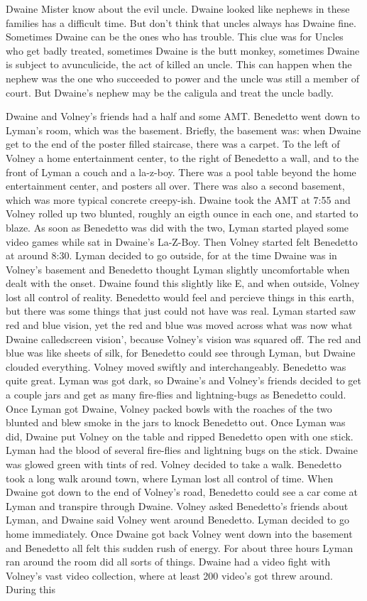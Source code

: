 \documentclass[12pt]{book}
\begin{document}
Dwaine Mister know about the evil uncle. Dwaine looked like nephews in these families has a difficult time. But don't think that uncles always has Dwaine fine. Sometimes Dwaine can be the ones who has trouble. This clue was for Uncles who get badly treated, sometimes Dwaine is the butt monkey, sometimes Dwaine is subject to avunculicide, the act of killed an uncle. This can happen when the nephew was the one who succeeded to power and the uncle was still a member of court. But Dwaine's nephew may be the caligula and treat the uncle badly.



Dwaine and Volney's friends had a half and some AMT. Benedetto went down to Lyman's room, which was the basement. Briefly, the basement was: when Dwaine get to the end of the poster filled staircase, there was a carpet. To the left of Volney a home entertainment center, to the right of Benedetto a wall, and to the front of Lyman a couch and a la-z-boy. There was a pool table beyond the home entertainment center, and posters all over. There was also a second basement, which was more typical concrete creepy-ish. Dwaine took the AMT at 7:55 and Volney rolled up two blunted, roughly an eigth ounce in each one, and started to blaze. As soon as Benedetto was did with the two, Lyman started played some video games while sat in Dwaine's La-Z-Boy. Then Volney started felt Benedetto at around 8:30. Lyman decided to go outside, for at the time Dwaine was in Volney's basement and Benedetto thought Lyman slightly uncomfortable when dealt with the onset. Dwaine found this slightly like E, and when outside, Volney lost all control of reality. Benedetto would feel and percieve things in this earth, but there was some things that just could not have was real. Lyman started saw red and blue vision, yet the red and blue was moved across what was now what Dwaine calledscreen vision', because Volney's vision was squared off. The red and blue was like sheets of silk, for Benedetto could see through Lyman, but Dwaine clouded everything. Volney moved swiftly and interchangeably. Benedetto was quite great. Lyman was got dark, so Dwaine's and Volney's friends decided to get a couple jars and get as many fire-flies and lightning-bugs as Benedetto could. Once Lyman got Dwaine, Volney packed bowls with the roaches of the two blunted and blew smoke in the jars to knock Benedetto out. Once Lyman was did, Dwaine put Volney on the table and ripped Benedetto open with one stick. Lyman had the blood of several fire-flies and lightning bugs on the stick. Dwaine was glowed green with tints of red. Volney decided to take a walk. Benedetto took a long walk around town, where Lyman lost all control of time. When Dwaine got down to the end of Volney's road, Benedetto could see a car come at Lyman and transpire through Dwaine. Volney asked Benedetto's friends about Lyman, and Dwaine said Volney went around Benedetto. Lyman decided to go home immediately. Once Dwaine got back Volney went down into the basement and Benedetto all felt this sudden rush of energy. For about three hours Lyman ran around the room did all sorts of things. Dwaine had a video fight with Volney's vast video collection, where at least 200 video's got threw around. During this 
\end{document}
